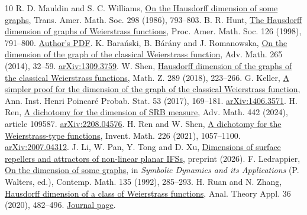 \documentclass[11pt,a4paper]{article}
\begin{document}
\begin{thebibliography}{10}
 R. D. Mauldin and S. C. Williams, \href{https://sites.itservices.cas.unt.edu/~mauldin/papers/no60.pdf}{On the Hausdorff dimension of some graphs}, Trans. Amer. Math. Soc. 298 (1986), 793--803.
 B. R. Hunt, \href{https://doi.org/10.1090/S0002-9939-98-04387-1}{The Hausdorff dimension of graphs of Weierstrass functions}, Proc. Amer. Math. Soc. 126 (1998), 791--800.
\href{https://user.eng.umd.edu/~bhunt/papers/hdimw.pdf}{Author's PDF}.
 K. Bara\'nski, B. B\'ar\'any and J. Romanowska,
\href{https://doi.org/10.1016/j.aim.2014.07.033}{On the dimension of
the graph of the classical Weierstrass function}, Adv. Math. 265
(2014), 32--59.
\href{https://arxiv.org/abs/1309.3759}{arXiv:1309.3759}.
 W. Shen, \href{https://arxiv.org/abs/1505.03986}{Hausdorff dimension of the graphs of the classical Weierstrass functions}, Math. Z. 289 (2018), 223--266.
 G. Keller, \href{https://doi.org/10.1214/15-AIHP711}{A simpler proof for the dimension of the graph of the classical Weierstrass function}, Ann. Inst. Henri Poincar\'e Probab. Stat. 53 (2017), 169--181.
\href{https://arxiv.org/abs/1406.3571}{arXiv:1406.3571}.
 H. Ren, \href{https://doi.org/10.1016/j.aim.2024.109587}{A dichotomy for the dimension of SRB measure}, Adv. Math. 442 (2024), article 109587.
\href{https://arxiv.org/abs/2208.04576}{arXiv:2208.04576}.
 H. Ren and W. Shen,
\href{https://doi.org/10.1007/s00222-021-01060-2}{A dichotomy for the
Weierstrass-type functions}, Invent. Math. 226 (2021), 1057--1100.
\href{https://arxiv.org/abs/2007.04312}{arXiv:2007.04312}.
 J. Li, W. Pan, Y. Tong and D. Xu, \href{https://arxiv.org/abs/2608.30744}{Dimensions of surface repellers and attractors of non-linear planar IFSs}, preprint (2026).
 F. Ledrappier, \href{https://doi.org/10.1090/conm/135/1185095}{On the dimension of some graphs}, in \emph{Symbolic Dynamics and its Applications} (P. Walters, ed.), Contemp. Math. 135 (1992), 285--293.
 H. Ruan and N. Zhang, \href{https://doi.org/10.4208/ata.OA-SU8}{Hausdorff dimension of a class of Weierstrass functions}, Anal. Theory Appl. 36 (2020), 482--496.
\href{https://www.global-sci.com/ata/article/view/8206}{Journal page}.
\end{thebibliography}
\end{document}
